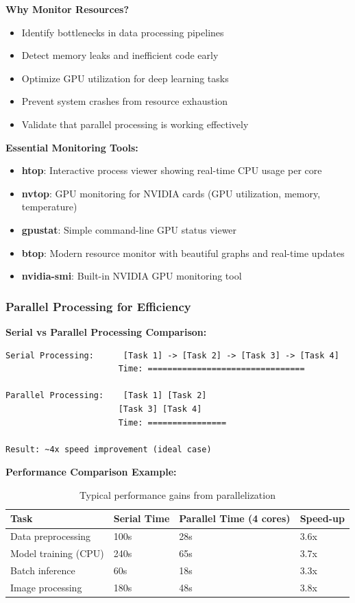 \documentclass[11pt,a4paper]{article}
\begin{document}
\textbf{Why Monitor Resources?}
\begin{itemize}
    \item Identify bottlenecks in data processing pipelines
    \item Detect memory leaks and inefficient code early
    \item Optimize GPU utilization for deep learning tasks
    \item Prevent system crashes from resource exhaustion
    \item Validate that parallel processing is working effectively
\end{itemize}

\textbf{Essential Monitoring Tools:}
\begin{itemize}
    \item \textbf{htop}: Interactive process viewer showing real-time CPU usage per core
    \item \textbf{nvtop}: GPU monitoring for NVIDIA cards (GPU utilization, memory, temperature)
    \item \textbf{gpustat}: Simple command-line GPU status viewer
    \item \textbf{btop}: Modern resource monitor with beautiful graphs and real-time updates
    \item \textbf{nvidia-smi}: Built-in NVIDIA GPU monitoring tool
\end{itemize}

\subsubsection{Parallel Processing for Efficiency}

\textbf{Serial vs Parallel Processing Comparison:}

\begin{verbatim}
Serial Processing:      [Task 1] -> [Task 2] -> [Task 3] -> [Task 4]
                       Time: ================================
                       
Parallel Processing:    [Task 1] [Task 2]
                       [Task 3] [Task 4]
                       Time: ================
                       
Result: ~4x speed improvement (ideal case)
\end{verbatim}

\textbf{Performance Comparison Example:}
\begin{table}[H]
\centering
\begin{tabular}{@{}llll@{}}
\toprule
\textbf{Task} & \textbf{Serial Time} & \textbf{Parallel Time (4 cores)} & \textbf{Speed-up} \\
\midrule
Data preprocessing & 100s & 28s & 3.6x \\
Model training (CPU) & 240s & 65s & 3.7x \\
Batch inference & 60s & 18s & 3.3x \\
Image processing & 180s & 48s & 3.8x \\
\bottomrule
\end{tabular}
\caption{Typical performance gains from parallelization}
\end{table}
\end{document}

